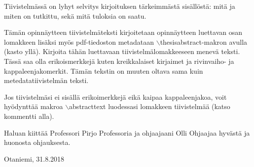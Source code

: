 \documentclass[finnish, 12pt, a4paper, elec, utf8, a-1b, online]{aaltothesis}
\date{xx.xx.2022}
\begin{document}
\makecoverpage{}

\makecopyrightpage{}

\begin{abstractpage}[finnish]
Tiivistelmässä on lyhyt selvitys kirjoituksen tärkeimmästä sisällöstä: mitä ja
miten on tutkittu, sekä mitä tuloksia on saatu.

Tämän opinnäytteen tiivistelmäteksti kirjoitetaan opinnäytteen luettavan osan
lomakkeen lisäksi myös pdf-tiedoston metadataan
$\backslash$thesisabstract-makron avulla (kasto yllä). Kirjoita tähän
luettavaan tiivistelmälomakkeeseen menevä teksti. Tässä saa olla erikoismerkkejä
kuten kreikkalaiset kirjaimet ja rivinvaiho- ja kappaleenjakomerkit. Tämän
tekstin on muuten oltava sama kuin metedatatiivistelmän teksti.

Jos tiivistelmäsi ei sisällä erikoimerkkejä eikä kaipaa kappaleenjakoa, voit
hyödynttää makroa $\backslash$abstracttext luodessasi lomakkeen tiivistelmää
(katso kommentti alla).

\end{abstractpage}




Haluan kiittää Professori Pirjo Professoria ja ohjaajaani Olli Ohjaajaa hyvästä
ja huonosta ohjauksesta.

\vspace{5cm}
Otaniemi, 31.8.2018
\end{document}
